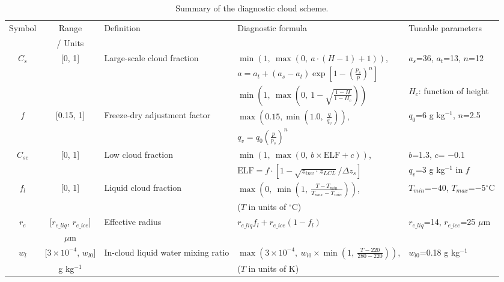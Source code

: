 \begin{table}
	\caption{Summary of the diagnostic cloud scheme.}
	\vspace{0.5em}
	\centering
	\renewcommand{\arraystretch}{1.5}
	\begin{tabular}{c c p{6cm} p{7cm} l} 
		\toprule
			\multirow{2}{*}{Symbol} & Range  & \multirow{2}{*}{Definition} & \multirow{2}{*}{Diagnostic formula} & \multirow{2}{*}{Tunable parameters} \\
			& / Units & & & \\
			\hline
			\multirow{3}{*}{$C_s$} & \multirow{3}{*}{[0, 1]} & \multirow{3}{*}{Large-scale cloud fraction} & $\min\left(1, ~\max \left(0, ~a \cdot (H-1) + 1 \right)\right)$,&  \multirow{2}{*}{$a_s$=36, $a_t$=13, $n$=12} \\
			& &  &	$a=a_t + (a_s-a_t)\exp{\left[1-\left( \frac{p_s}{p} \right)^{n} \right]}$& \\ \cline{4-5}
			& &  &	$\min\left(1, ~\max \left(0, ~1-\sqrt{\frac{1-H}{1-H_{c}}} \right)\right)$ & $H_c$: function of height  \\
			\hline
			\multirow{2}{*}{$f$}  & \multirow{2}{*}{[0.15, 1]} & \multirow{2}{*}{Freeze-dry adjustment factor} & $\max \left(0.15, \min \left(1.0, ~\frac{q}{q_{v}}\right)\right)$, & \multirow{2}{*}{$q_0$=6 g kg$^{-1}$, $n$=2.5} \\
			& & & $q_{v}= q_0\left(\frac{p}{p_s}\right)^n$ & \\
			\hline 
			\multirow{2}{*}{$C_{sc}$} & \multirow{2}{*}{[0, 1]} & \multirow{2}{*}{Low cloud fraction} & $\min(1, ~\max(0, ~b\times \text{ELF} +c))$, & $b$=$1.3$, $c$= $-0.1$  \\
			& & &  $\text{ELF}=f \cdot\left[1-\sqrt{z_{inv} \cdot z_{LCL}}/{\Delta z_{s}}\right]$  & $q_v$=3 g kg$^{-1}$ in $f$ \\
			\hline 
			\multirow{2}{*}{$f_l$} & \multirow{2}{*}{[0, 1]}  & \multirow{2}{*}{Liquid cloud fraction} & $\max\left(0, ~\min\left(1, ~\frac{T-T_{min}}{T_{max}-T_{min}} \right)\right)$, & \multirow{2}{*}{$T_{min}$=$-40$, $T_{max}$=$-5$$^\circ$C} \\
			& & & ($T$ in units of $^\circ$C) & \\
			\multirow{2}{*}{$r_e$} & [$r_{e\_liq}$, $r_{e\_ice}$] & \multirow{2}{*}{Effective radius} & \multirow{2}{*}{$r_{e\_liq}f_l + r_{e\_ice}(1-f_l)$} & \multirow{2}{*}{$r_{e\_liq}$=14, $r_{e\_ice}$=25 $\mu$m} \\
			&  $\mu$m & & & \\
			\hline
			\multirow{2}{*}{$w_l$} & [$3\times 10^{-4}$, $w_{l0}$] & \multirow{2}{*}{In-cloud liquid water mixing ratio} & $\max\left(3\times 10^{-4}, ~w_{l0}\times \min\left(1, ~\frac{T-220}{280-220}\right)\right)$,& \multirow{2}{*}{$w_{l0}$=0.18 g kg$^{-1}$} \\
			& g kg$^{-1}$ & & ($T$ in units of K)  & \\
		\bottomrule
	\end{tabular}
	\label{tab:cld_scheme_summary}
\end{table}
